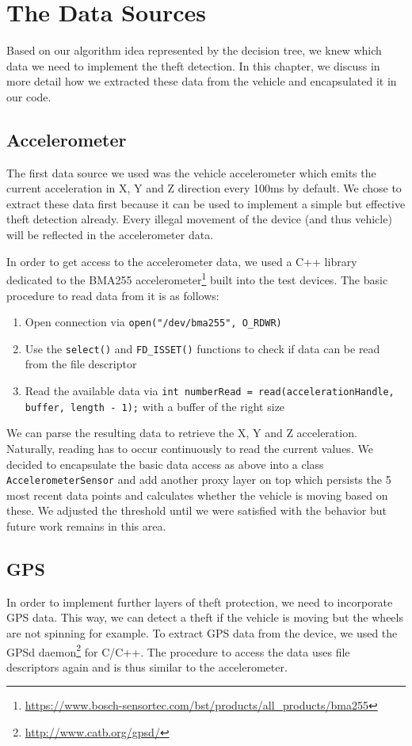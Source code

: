 \section{The Data Sources}

Based on our algorithm idea represented by the decision tree, we knew which data we need to implement the theft detection. In this chapter, we discuss in more detail how we extracted these data from the vehicle and encapsulated it in our code.

\subsection{Accelerometer}
The first data source we used was the vehicle accelerometer which emits the current acceleration in X, Y and Z direction every 100ms by default. We chose to extract these data first because it can be used to implement a simple but effective theft detection already. Every illegal movement of the device (and thus vehicle) will be reflected in the accelerometer data.

In order to get access to the accelerometer data, we used a C++ library dedicated to the BMA255 accelerometer\footnote{\url{https://www.bosch-sensortec.com/bst/products/all_products/bma255}} built into the test devices. The basic procedure to read data from it is as follows:

\begin{enumerate}
	\item Open connection via \texttt{open("/dev/bma255", O\_RDWR)}
	\item Use the \texttt{select()} and \texttt{FD\_ISSET()} functions to check if data can be read from the file descriptor
	\item Read the available data via \texttt{int numberRead = read(accelerationHandle, buffer, length - 1);} with a buffer of the right size
\end{enumerate}

We can parse the resulting data to retrieve the X, Y and Z acceleration. Naturally, reading has to occur continuously to read the current values. We decided to encapsulate the basic data access as above into a class \texttt{AccelerometerSensor} and add another proxy layer on top which persists the 5 most recent data points and calculates whether the vehicle is moving based on these. We adjusted the threshold until we were satisfied with the behavior but future work remains in this area.

\subsection{GPS}
In order to implement further layers of theft protection, we need to incorporate GPS data. This way, we can detect a theft if the vehicle is moving but the wheels are not spinning for example. To extract GPS data from the device, we used the GPSd daemon\footnote{\url{http://www.catb.org/gpsd/}} for C/C++. The procedure to access the data uses file descriptors again and is thus similar to the accelerometer.

